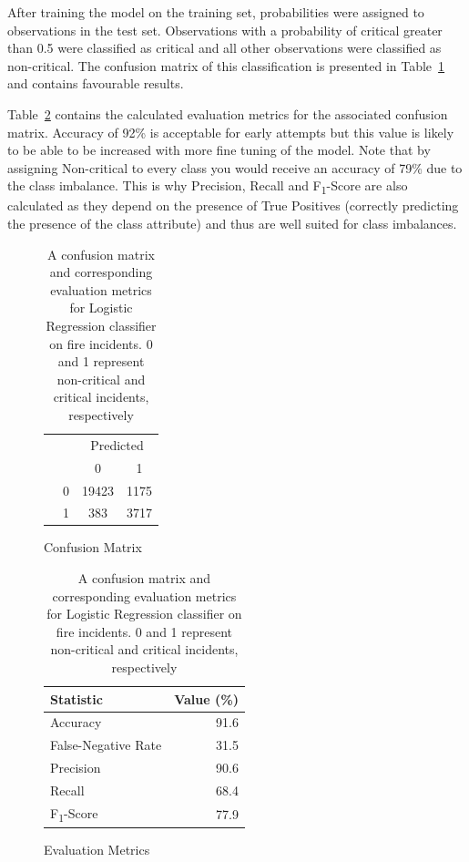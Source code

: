 \documentclass[12pt,letterpaper, oneside]
{article}
\begin{document}
After training the model on the training set, probabilities were assigned to observations in the test set. Observations with a probability of critical greater than 0.5 were classified as critical and all other observations were classified as non-critical. The confusion matrix of this classification is presented in Table~\ref{tab:lr-cm} and contains favourable results.

Table~\ref{tab:lr-stats} contains the calculated evaluation metrics for the associated confusion matrix. Accuracy of 92\% is acceptable for early attempts but this value is likely to be able to be increased with more fine tuning of the model. Note that by assigning Non-critical to every class you would receive an accuracy of 79\% due to the class imbalance. This is why Precision, Recall and F\textsubscript{1}-Score are also calculated as they depend on the presence of True Positives (correctly predicting the presence of the class attribute) and thus are well suited for class imbalances.

\begin{table}
	\begin{subfigure}[h]{\textwidth}
		\centering
		\begin{tabular}{@{}cc cc@{}}
		\multicolumn{1}{c}{} &\multicolumn{1}{c}{} &\multicolumn{2}{c}{Predicted} \\ 
		\cmidrule(lr){3-4}
		\multicolumn{1}{c}{} & 
		\multicolumn{1}{c}{} & 
		\multicolumn{1}{c}{0} & 
		\multicolumn{1}{c}{1} \\ 
		\cline{2-4}
		\multirow[c]{2}{*}{\rotatebox[origin=tr]{90}{Actual}}
		& 0  & 19423 & 1175   \\[1.5ex]
		& 1  & 383   & 3717 \\ 
		\cline{2-4}
		\end{tabular}
		\caption{
			Confusion Matrix
			\label{tab:lr-cm}
		}
	\end{subfigure}
	\begin{subfigure}[h]{\textwidth}
		\begin{tabular}{l r}\toprule
			Statistic & Value (\%) \\ \midrule
			Accuracy & 91.6 \\
			False-Negative Rate & 31.5 \\
			Precision & 90.6 \\
			Recall & 68.4 \\
			F\textsubscript{1}-Score & 77.9 \\ \bottomrule
		\end{tabular}
		\caption{Evaluation Metrics
			\label{tab:lr-stats}
		}
	\end{subfigure}
	\caption{A confusion matrix and corresponding evaluation metrics for Logistic Regression classifier on fire incidents.	0 and 1 represent non-critical and critical incidents, respectively}

\end{table}
\end{document}
